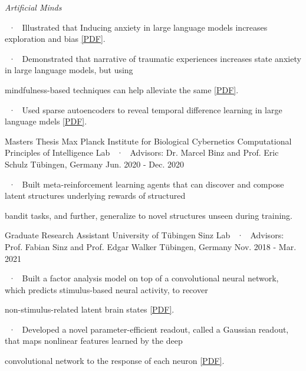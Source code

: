 \begin{cventries}
{\begin{cvitems}
      \item \textit{Artificial Minds}
      \item ~·~ Illustrated that Inducing anxiety in large language models increases exploration and bias \href{https://arxiv.org/abs/2304.11111}{[PDF]}.
      \item ~·~ Demonstrated that narrative of traumatic experiences increases state anxiety in large language models, but using 
      \item \phantom{~·~} mindfulness-based techniques can help alleviate the same \href{https://www.nature.com/articles/s41746-025-01512-6}{[PDF]}.
      \item ~·~ Used sparse autoencoders to reveal temporal difference learning in large language mdels \href{https://arxiv.org/pdf/2410.01280}{[PDF]}.       
    \end{cvitems}
    }

    \cventryLab
    {Masters Thesis}
    {Max Planck Institute for Biological Cybernetics } %
    {Computational Principles of Intelligence Lab ~·~ Advisors: Dr. Marcel Binz and Prof. Eric Schulz}%
    {Tübingen, Germany} %
    {Jun. 2020 - Dec. 2020}
    {%
    \begin{cvitems}
     \item ~·~ Built meta-reinforcement learning agents that can discover and compose latent structures underlying rewards of structured 
     \item \phantom{~·~} bandit tasks, and further, generalize to novel structures unseen during training.
    \end{cvitems}
    }

  \cventryLab
    {Graduate Research Assistant} %
    {University of Tübingen} %
    {Sinz Lab ~·~ Advisors: Prof. Fabian Sinz and Prof. Edgar Walker} %
    {Tübingen, Germany} %
    {Nov. 2018 - Mar. 2021} %
    { %
      \begin{cvitems}
      \item ~·~ Built a factor analysis model on top of a convolutional neural network, which predicts stimulus-based neural activity, to recover 
       \item \phantom{~·~} non-stimulus-related latent brain states \href{https://proceedings.neurips.cc/paper/2021/file/84a529a92de322be42dd3365afd54f91-Paper.pdf}{[PDF]}. 
      \item ~·~ Developed a novel parameter-efficient readout, called a Gaussian readout, that maps nonlinear features learned by the deep 
       \item \phantom{~·~} convolutional network to the response of each neuron \href{ https://openreview.net/pdf?id=Tp7kI90Htd}{[PDF]}.
      \end{cvitems}
    }


\end{cventries}
